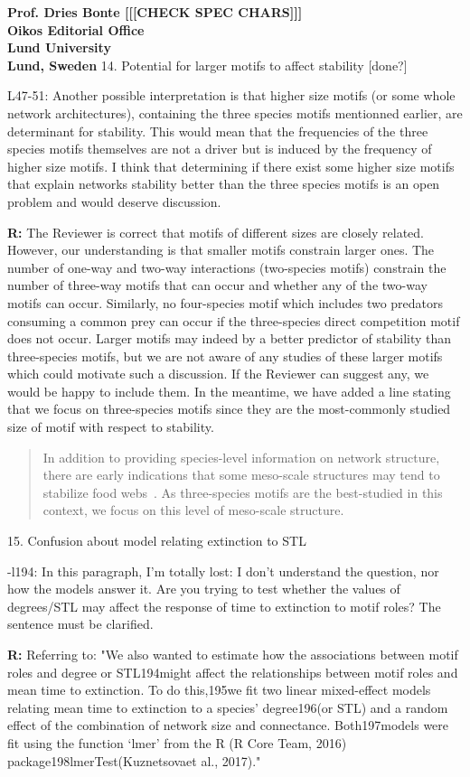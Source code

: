 \documentclass[12pt]{letter}
\begin{document}
\begin{letter}{\bf Prof. Dries Bonte [[[CHECK SPEC CHARS]]]\\
Oikos Editorial Office \\
Lund University \\
Lund, Sweden}
    14. Potential for larger motifs to affect stability [done?]

      L47-51: Another possible interpretation is that higher size motifs (or some whole network architectures), containing the three species motifs mentionned earlier, are determinant for stability. This would mean that the frequencies of the three species motifs themselves are not a driver but is induced by the frequency of higher size motifs. I think that determining if there exist some higher size motifs that explain networks stability better than the three species motifs is an open problem and would deserve discussion.

      \textbf{R:} The Reviewer is correct that motifs of different sizes are closely related. However, our understanding is that smaller motifs constrain larger ones. The number of one-way and two-way interactions (two-species motifs) constrain the number of three-way motifs that can occur and whether any of the two-way motifs can occur. Similarly, no four-species motif which includes two predators consuming a common prey can occur if the three-species direct competition motif does not occur. Larger motifs may indeed by a better predictor of stability than three-species motifs, but we are not aware of any studies of these larger motifs which could motivate such a discussion. If the Reviewer can suggest any, we would be happy to include them. In the meantime, we have added a line stating that we focus on three-species motifs since they are the most-commonly studied size of motif with respect to stability.


      \begin{quotation}
          In addition to providing species-level information on network structure, there are early indications that some meso-scale structures may tend to stabilize food webs~\citep{Prill2005,Borrelli2015,Monteiro2016}. 
          As three-species motifs are the best-studied in this context, we focus on this level of meso-scale structure.
      \end{quotation}



    15. Confusion about model relating extinction to STL

      -l194: In this paragraph, I’m totally lost: I don’t understand the question, nor how the models answer it. Are you trying to test whether the values of degrees/STL may affect the response of time to extinction to motif roles? The sentence must be clarified.

      \textbf{R:}
      Referring to: "We also wanted to estimate how the associations between motif roles and degree or STL194might affect the relationships between motif roles and mean time to extinction. To do this,195we fit two linear mixed-effect models relating mean time to extinction to a species’ degree196(or STL) and a random effect of the combination of network size and connectance. Both197models were fit using the function ‘lmer’ from the R (R Core Team, 2016) package198lmerTest(Kuznetsovaet al., 2017)."



\end{letter}
\end{document}
